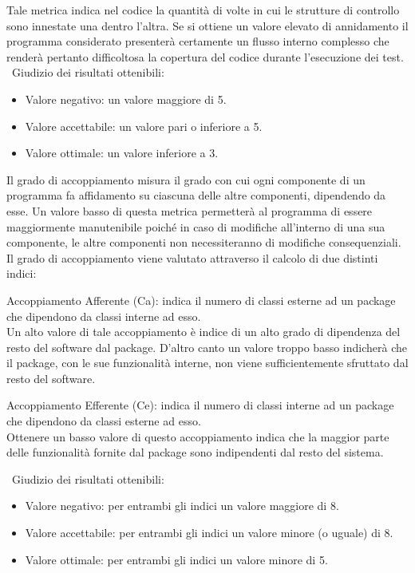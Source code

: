 \documentclass[a4paper, titlepage]{article}
\begin{document}
Tale metrica indica nel codice la quantità di volte in cui le strutture di controllo sono innestate una dentro l’altra. Se si ottiene un valore elevato di annidamento il programma considerato presenterà certamente un flusso interno complesso che renderà pertanto difficoltosa la copertura del codice durante l'esecuzione dei test. 
\
\newline Giudizio dei risultati ottenibili:
\begin{itemize}
\item Valore negativo: un valore maggiore di 5.  
\item Valore accettabile: un valore pari o inferiore a 5.
\item Valore ottimale: un valore inferiore a 3.
\end{itemize}

Il grado di accoppiamento misura il grado con cui ogni componente di un programma fa affidamento su ciascuna delle altre componenti, dipendendo da esse.
Un valore basso di questa metrica permetterà al programma di essere maggiormente manutenibile poiché in caso di modifiche all'interno di una sua componente, le altre componenti non necessiteranno di modifiche consequenziali.
\\ Il grado di accoppiamento viene valutato attraverso il calcolo di due distinti indici:
\begin{description}
\item{ Accoppiamento Afferente (Ca):} indica il numero di classi esterne ad un package che dipendono da classi interne ad esso. 
\\ Un alto valore di tale accoppiamento è indice di un alto grado di dipendenza del resto del software dal package. D'altro canto un valore troppo basso indicherà che il package, con le sue funzionalità interne, non viene sufficientemente sfruttato dal resto del software.
\item{Accoppiamento Efferente (Ce):} indica il numero di classi interne ad un package che dipendono da classi esterne ad esso. 
\\Ottenere un basso valore di questo accoppiamento indica che la maggior parte delle funzionalità fornite dal package sono indipendenti dal resto del sistema.
\end{description}
\
\newline Giudizio dei risultati ottenibili:
\begin{itemize}
\item Valore negativo: per entrambi gli indici un valore maggiore di 8.   
\item Valore accettabile: per entrambi gli indici un valore minore (o uguale) di 8.
\item Valore ottimale: per entrambi gli indici un valore minore di 5.
\end{itemize}
\end{document}
